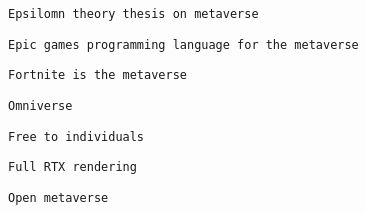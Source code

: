 \begin{verbatim}
\end{verbatim}
         
       

       
       
        \protect\hypertarget{ID_1822623983}{}{}

\begin{verbatim}
Epsilomn theory thesis on metaverse
\end{verbatim}
       

       
       
        \protect\hypertarget{ID_51366861}{}{}

\begin{verbatim}
Epic games programming language for the metaverse
\end{verbatim}
       

       
       
        \protect\hypertarget{ID_1389744907}{}{}

\begin{verbatim}
Fortnite is the metaverse
\end{verbatim}
       
     

     
     
      \protect\hypertarget{ID_67952672}{}{}

\begin{verbatim}
Omniverse
\end{verbatim}

       
       
        \protect\hypertarget{ID_571823376}{}{}

\begin{verbatim}
Free to individuals
\end{verbatim}
       

       
       
        \protect\hypertarget{ID_1536249246}{}{}

\begin{verbatim}
Full RTX rendering
\end{verbatim}
       
     

     
     
      \protect\hypertarget{ID_1352438902}{}{}

\begin{verbatim}
Open metaverse
\end{verbatim}

       
       

